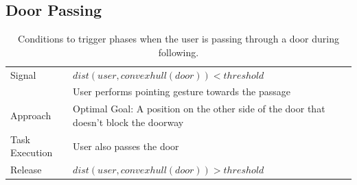 \documentclass[12pt]{gatech-thesis}
\begin{document}
%
%
%
%

\subsection{Door Passing}
\label{sec:following_door_passing}

\begin{table}[H]
	\centering
  \begin{tabular}{l |  m{10cm}}    
    \toprule    
    Signal & {$dist(user, convexhull(door))<threshold$}\\       
	                           & {User performs pointing gesture towards the passage}\\ \midrule   		                                	                           
    Approach & {Optimal Goal: A position on the other side of the door that doesn't block the doorway}\\       \midrule
    Task Execution & {User also passes the door}\\  \midrule
    Release & {$dist(user, convexhull(door))>threshold$ }\\ 
    \bottomrule
  \end{tabular}
      \caption{Conditions to trigger phases when the user is passing through a door during following.}
    \label{table:situation_aware_list_group}
\end{table}
\end{document}
